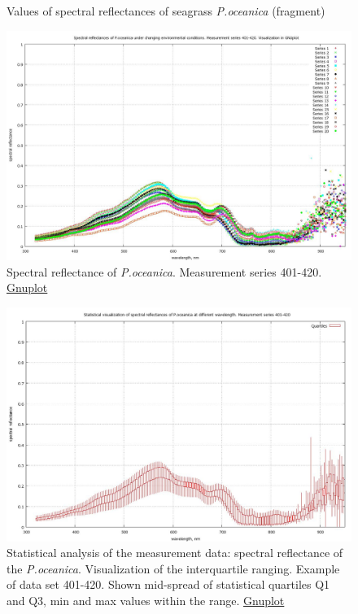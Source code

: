 \documentclass[11pt]{article}
\begin{document}
\begin{appendices}
\begin{figure}[h]
\begin{center}
		\caption{Values of spectral reflectances of seagrass \textit{P.oceanica} (fragment)}
		\label{fig:A.11}
	\end{center}
\end{figure}
\begin{figure}[h]
	\begin{center}
		\includegraphics[scale=0.25]{GNU-401-420.jpg}
		\caption{Spectral reflectance of \textit{P.oceanica}. Measurement series 401-420. \href{http://www.gnuplot.info/}{Gnuplot}}
		\label{fig:A.12}
	\end{center}
\end{figure}
\begin{figure}[H]
	\begin{center}
		\includegraphics[scale=0.25]{GNU-401-420-candles.jpg}
		\caption{Statistical analysis of the measurement data: spectral reflectance of the \textit{P.oceanica}. 
		Visualization of the interquartile ranging. Example of data set 401-420. Shown mid-spread of  statistical quartiles Q1 and Q3, min and max values within the range. \href{http://www.gnuplot.info/}{Gnuplot}}

\end{center}
\end{figure}
\end{appendices}
\end{document}
